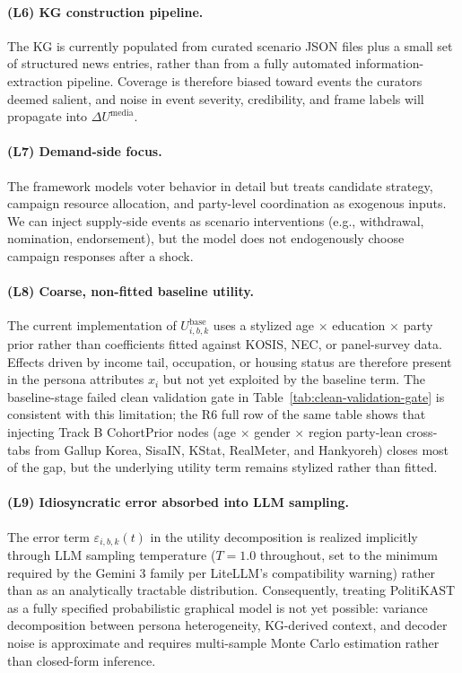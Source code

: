 \documentclass[11pt]{article}
\begin{document}
\paragraph{(L6) KG construction pipeline.}
The KG is currently populated from curated scenario JSON files plus a small set of structured news entries, rather than from a fully automated information-extraction pipeline. Coverage is therefore biased toward events the curators deemed salient, and noise in event severity, credibility, and frame labels will propagate into $\Delta U^{\text{media}}$.

\paragraph{(L7) Demand-side focus.}
The framework models voter behavior in detail but treats candidate strategy, campaign resource allocation, and party-level coordination as exogenous inputs. We can inject supply-side events as scenario interventions (e.g., withdrawal, nomination, endorsement), but the model does not endogenously choose campaign responses after a shock.

\paragraph{(L8) Coarse, non-fitted baseline utility.}
The current implementation of $U^{\text{base}}_{i,b,k}$ uses a stylized age $\times$ education $\times$ party prior rather than coefficients fitted against KOSIS, NEC, or panel-survey data. Effects driven by income tail, occupation, or housing status are therefore present in the persona attributes $x_i$ but not yet exploited by the baseline term. The baseline-stage failed clean validation gate in Table~\ref{tab:clean-validation-gate} is consistent with this limitation; the R6 full row of the same table shows that injecting Track B CohortPrior nodes (age $\times$ gender $\times$ region party-lean cross-tabs from Gallup Korea, SisaIN, KStat, RealMeter, and Hankyoreh) closes most of the gap, but the underlying utility term remains stylized rather than fitted.

\paragraph{(L9) Idiosyncratic error absorbed into LLM sampling.}
The error term $\varepsilon_{i,b,k}(t)$ in the utility decomposition is realized implicitly through LLM sampling temperature ($T=1.0$ throughout, set to the minimum required by the Gemini 3 family per LiteLLM's compatibility warning) rather than as an analytically tractable distribution. Consequently, treating PolitiKAST as a fully specified probabilistic graphical model is not yet possible: variance decomposition between persona heterogeneity, KG-derived context, and decoder noise is approximate and requires multi-sample Monte Carlo estimation rather than closed-form inference.
\end{document}
